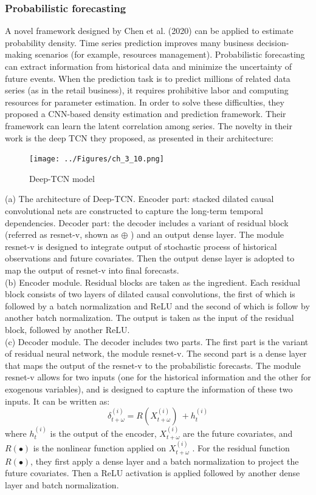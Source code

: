 \subsubsection{Probabilistic forecasting}
A novel framework designed by Chen et al. (2020) can be applied to estimate probability density. Time series prediction improves many business decision-making scenarios (for example, resources management). Probabilistic forecasting can extract information from historical data and minimize the uncertainty of future events. When the prediction task is to predict millions of related data series (as in the retail business), it requires prohibitive labor and computing resources for parameter estimation. In order to solve these difficulties, they proposed a CNN-based density estimation and prediction framework. Their framework can learn the latent correlation among series. The novelty in their work is the deep TCN they proposed, as presented in their architecture:
\begin{figure}[H]
    \texttt{[image: ../Figures/ch\_3\_10.png]}
    \caption{Deep-TCN model}
\end{figure}
(a) The architecture of Deep-TCN. Encoder part: stacked dilated causal convolutional nets are constructed to capture the long-term temporal dependencies. Decoder part: the decoder includes a variant of residual block (referred as resnet-v, shown as $\oplus$ ) and an output dense layer. The module resnet-v is designed to integrate output of stochastic process of historical observations and future covariates. Then the output dense layer is adopted to map the output of resnet-v into final forecasts. \\
(b) Encoder module. Residual blocks are taken as the ingredient. Each residual block consists of two layers of dilated causal convolutions, the first of which is followed by a batch normalization and ReLU and the second of which is follow by another batch normalization. The output is taken as the input of the residual block, followed by another ReLU. \\
(c) Decoder module. The decoder includes two parts. The first part is the variant of residual neural network, the module resnet-v. The second part is a dense layer that maps the output of the resnet-v to the probabilistic forecasts. The module resnet-v allows for two inputs (one for the historical information and the other for exogenous variables), and is designed to capture the information of these two inputs. It can be written as:
$$\delta_{t+\omega}^{(i)}=R(X_{t+\omega}^{\left(i\right)})\ +h_t^{\left(i\right)}$$
where $h_t^{\left(i\right)}$  is the output of the encoder, $X_{t+\omega}^{\left(i\right)}$  are the future covariates, and $R(\bullet)$  is the nonlinear function applied on $X_{t+\omega}^{\left(i\right)}$ . For the residual function  $R(\bullet)$, they first apply a dense layer and a batch normalization to project the future covariates. Then a ReLU activation is applied followed by another dense layer and batch normalization.

